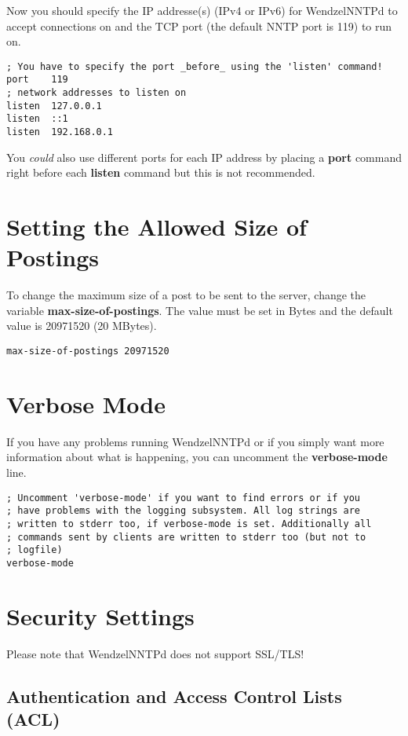 Now you should specify the IP addresse(s) (IPv4 or IPv6) for WendzelNNTPd to accept connections on and the TCP port (the default NNTP port is 119) to run on.

\begin{verbatim}
; You have to specify the port _before_ using the 'listen' command!
port	119
; network addresses to listen on
listen	127.0.0.1
listen	::1
listen	192.168.0.1
\end{verbatim}

You \textit{could} also use different ports for each IP address by placing a \textbf{port} command right before each \textbf{listen} command but this is not recommended.

\section{Setting the Allowed Size of Postings}

To change the maximum size of a post to be sent to the server, change the variable \textbf{max-size-of-postings}. The value must be set in Bytes and the default value is 20971520 (20 MBytes).

\begin{verbatim}
max-size-of-postings 20971520
\end{verbatim}

\section{Verbose Mode}

If you have any problems running WendzelNNTPd or if you simply want more information about what is happening, you can uncomment the \textbf{verbose-mode} line.

\begin{verbatim}
; Uncomment 'verbose-mode' if you want to find errors or if you
; have problems with the logging subsystem. All log strings are
; written to stderr too, if verbose-mode is set. Additionally all
; commands sent by clients are written to stderr too (but not to
; logfile)
verbose-mode
\end{verbatim}

\section{Security Settings}

Please note that WendzelNNTPd does not support SSL/TLS!

\subsection{Authentication and Access Control Lists (ACL)}

